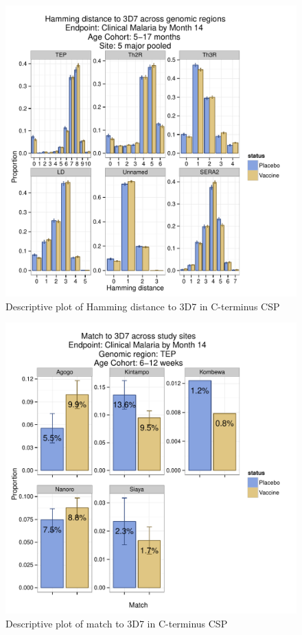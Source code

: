 \documentclass[]{article}
\begin{document}
\begin{figure}[htbp]
\centering
\includegraphics{figures/hamming-infant-c-1.pdf}
\caption{Descriptive plot of Hamming distance to 3D7 in C-terminus CSP}
\end{figure}

\begin{figure}[htbp]
\centering
\includegraphics{figures/match-newborn-sites-c-1.pdf}
\caption{Descriptive plot of match to 3D7 in C-terminus CSP}
\end{figure}
\end{document}

